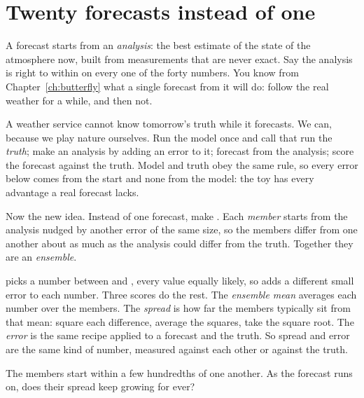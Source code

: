 \section{Twenty forecasts instead of one}
\label{sec:ch14-ensemble}

\noindent
A forecast starts from an \emph{analysis}: the best estimate of the state of
the atmosphere now, built from measurements that are never exact. Say the
analysis is right to within  on every one of the forty
numbers. You know from Chapter~\ref{ch:butterfly} what a single forecast from
it will do: follow the real weather for a while, and then not.

A weather service cannot know tomorrow's truth while it forecasts. We can,
because we play nature ourselves. Run the model once and call that run the
\emph{truth}; make an analysis by adding an error to it; forecast from the
analysis; score the forecast against the truth. Model and truth obey the
same rule, so every error below comes from the start and none from the
model: the toy has every advantage a real forecast lacks.

Now the new idea. Instead of one forecast, make . Each
\emph{member} starts from the analysis nudged by another error of the same
size, so the members differ from one another about as much as the analysis
could differ from the truth. Together they are an \emph{ensemble}.


\noindent
{} picks a number between  and
, every value equally likely, so  adds a different
small error to each number. Three scores do the rest. The \emph{ensemble
mean} averages each number over the members. The \emph{spread} is how far
the members typically sit from that mean: square each difference, average
the squares, take the square root. The \emph{error} is the same recipe
applied to a forecast and the truth. So spread and error are the same kind
of number, measured against each other or against the truth.

\begin{think}
The members start within a few hundredths of one another. As the forecast
runs on, does their spread keep growing for ever?
\end{think}

